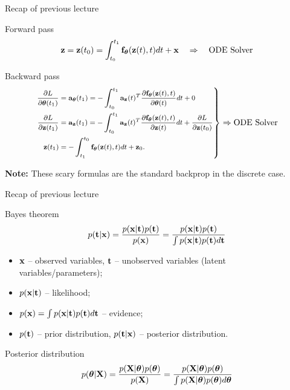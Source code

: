 \begin{frame}{Recap of previous lecture}
	\begin{block}{Forward pass}
		\vspace{-0.3cm}
		\[
		\mathbf{z} = \mathbf{z}(t_0) = \int^{t_1}_{t_0} \mathbf{f}_{\boldsymbol{\theta}}(\mathbf{z}(t), t) d t  + \mathbf{x} \quad \Rightarrow \quad \text{ODE Solver}
		\]
		\vspace{-0.4cm}
	\end{block}
	\begin{block}{Backward pass}
		\vspace{-0.5cm}
		\begin{equation*}
			\left.
			{\footnotesize 
				\begin{aligned}
					\frac{\partial L}{\partial \boldsymbol{\theta}(t_1)} &= \mathbf{a}_{\boldsymbol{\theta}}(t_1) =  - \int_{t_0}^{t_1} \mathbf{a}_{\mathbf{z}}(t)^T \frac{\partial \mathbf{f}_{\boldsymbol{\theta}}(\mathbf{z}(t), t)}{\partial \boldsymbol{\theta}(t)} dt + 0 \\
					\frac{\partial L}{\partial \mathbf{z}(t_1)} &= \mathbf{a}_{\mathbf{z}}(t_1) =  - \int_{t_0}^{t_1} \mathbf{a}_{\mathbf{z}}(t)^T \frac{\partial \mathbf{f}_{\boldsymbol{\theta}}(\mathbf{z}(t), t)}{\partial \mathbf{z}(t)} dt + \frac{\partial L}{\partial \mathbf{z}(t_0)} \\
					\mathbf{z}(t_1) &= - \int^{t_0}_{t_1} \mathbf{f}_{\boldsymbol{\theta}}(\mathbf{z}(t), t) d t  + \mathbf{z}_0.
				\end{aligned}
			}
			\right\rbrace
			\Rightarrow
			\text{ODE Solver}
		\end{equation*}
		\vspace{-0.4cm} 
	\end{block}
	\textbf{Note:} These scary formulas are the standard backprop in the discrete case.
\end{frame}
\begin{frame}{Recap of previous lecture}
	\begin{block}{Bayes theorem}
		\[
			p(\mathbf{t} | \mathbf{x}) = \frac{p(\mathbf{x} | \mathbf{t}) p(\mathbf{t})}{p(\mathbf{x})} = \frac{p(\mathbf{x} | \mathbf{t}) p(\mathbf{t})}{\int p(\mathbf{x} | \mathbf{t}) p(\mathbf{t}) d \mathbf{t}} 
		\]
		\begin{itemize}
			\item $\mathbf{x}$ -- observed variables, $\mathbf{t}$ -- unobserved variables (latent variables/parameters);
			\item $p(\mathbf{x} | \mathbf{t})$ -- likelihood;
			\item $p(\mathbf{x}) = \int p(\mathbf{x} | \mathbf{t}) p(\mathbf{t}) d \mathbf{t}$ -- evidence;
			\item $p(\mathbf{t})$ -- prior distribution, $p(\mathbf{t} | \mathbf{x})$ -- posterior distribution.
		\end{itemize}
	\end{block}
	\begin{block}{Posterior distribution}
		\[
		p(\boldsymbol{\theta} | \mathbf{X}) = \frac{p(\mathbf{X} | \boldsymbol{\theta}) p(\boldsymbol{\theta})}{p(\mathbf{X})} = \frac{p(\mathbf{X} | \boldsymbol{\theta}) p(\boldsymbol{\theta})}{\int p(\mathbf{X} | \boldsymbol{\theta}) p(\boldsymbol{\theta}) d \boldsymbol{\theta}} 
		\]
		\vspace{-0.2cm}
	\end{block}
\end{frame}
